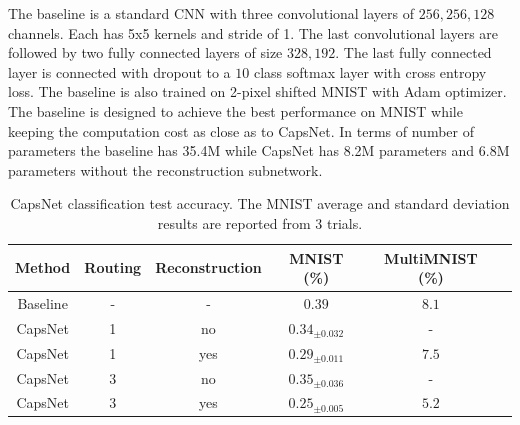 \documentclass{article}
\begin{document}
The baseline is a standard CNN with three convolutional layers of $256, 256, 128$ channels. Each has 5x5 kernels and stride of 1. The last convolutional layers are followed by two fully connected layers of size $328, 192$. The last fully connected layer is connected with dropout to a $10$ class softmax layer with cross entropy loss. The baseline is also trained on 2-pixel shifted MNIST with Adam optimizer. The baseline is designed to achieve the best performance on MNIST while keeping the computation cost as close as to CapsNet. In terms of number of parameters the baseline has 35.4M while CapsNet has 8.2M parameters and 6.8M parameters without the reconstruction subnetwork.

% 
\begin{table}[]
\centering
\caption{CapsNet classification test accuracy. The MNIST average and standard deviation results are reported from $3$ trials.}
\label{mnist-res}
\begin{tabular}{@{}cccccc@{}}
\toprule
Method   & Routing & Reconstruction & MNIST (\%)                & MultiMNIST (\%) \\ \midrule
Baseline & -       & -              & $0.39$                    & $8.1$      \\
CapsNet  & 1       & no             & $0.34_{\pm 0.032}$        & -          \\
CapsNet  & 1       & yes            & $0.29_{\pm 0.011}$        & $7.5$      \\
CapsNet  & 3       & no             & $0.35_{\pm 0.036}$        & -          \\
CapsNet  & 3       & yes            & $\bm{0.25}_{\pm 0.005}$   & $\bm{5.2}$ \\ \bottomrule
\end{tabular}
\end{table}
\end{document}
